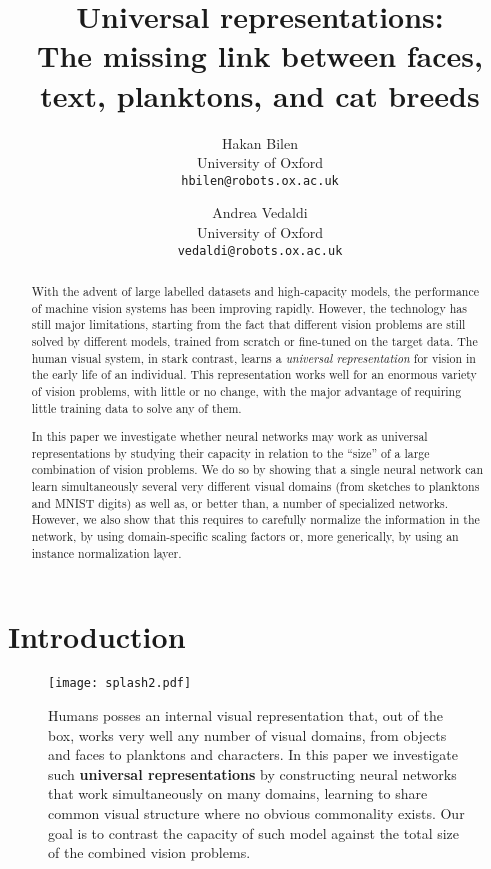 \documentclass[10pt,twocolumn,letterpaper]{article}
\title{Universal representations:\\
The missing link between faces, text, planktons, and cat breeds}
\author{Hakan Bilen\\
University of Oxford\\
{\tt\small hbilen@robots.ox.ac.uk}
\and
Andrea Vedaldi\\
University of Oxford\\
{\tt\small vedaldi@robots.ox.ac.uk}
}
\begin{document}
\maketitle
\begin{abstract}
With the advent of large labelled datasets and high-capacity models, the performance of machine vision systems has been improving rapidly. However, the technology has still major limitations, starting from the fact that different vision problems are still solved by different models, trained from scratch or fine-tuned on the target data. The human visual system, in stark contrast, learns a \emph{universal representation} for vision in the early life of an individual. This representation works well for an enormous variety of vision problems, with little or no change, with the major advantage of requiring little training data to solve any of them.

In this paper we investigate whether neural networks may work as universal representations by studying their capacity in relation to the ``size'' of a large combination of vision problems. We do so by showing that a single neural network can learn simultaneously several very different visual domains (from sketches to planktons and MNIST digits) as well as, or better than, a number of specialized networks. However, we also show that this requires to carefully normalize the information in the network, by using domain-specific scaling factors or, more generically, by using an instance normalization layer.
\end{abstract}

\section{Introduction}\label{s:intro}


\begin{figure}
\begin{center}
\texttt{[image: splash2.pdf]}
\end{center}
\caption{Humans posses an internal visual representation that, out of the box, works very well any number of visual domains, from objects and faces to planktons and characters. In this paper we investigate such {\bf universal representations} by constructing neural networks that work simultaneously on many domains, learning to share common visual structure where no obvious commonality exists. Our goal is to contrast the capacity of such model against the total size of the combined vision problems.}\label{f:splash}
\end{figure}
\end{document}
